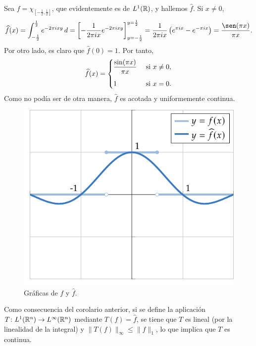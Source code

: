 \documentclass[a4paper, 11pt, oneside]{report}
\begin{document}
\begin{example}\label{eje:3.1.4}
  Sea $f = \chi_{[-\frac{1}{2},\frac{1}{2}]}$, que evidentemente es de $L^1(\mathbb R)$, y hallemos $\widehat{f}$. Si $x \neq 0$,
  \[\widehat{f}(x)
    = \int_{-\frac{1}{2}}^{\frac{1}{2}} e^{-2\pi i x y} \, d
    = \left[-\frac{1}{2\pi i x}e^{-2\pi i x y}\right]_{y = -\frac{1}{2}}^{y = \frac{1}{2}}
    = \frac{1}{2\pi i x}\left(e^{\pi i x} - e^{-\pi i x}\right)
    = \frac{\sen(\pi x)}{\pi x}.\]
  Por otro lado, es claro que $\widehat{f}(0)=1$. Por tanto,
  \[\widehat{f}(x) = \begin{cases}
    \displaystyle \frac{\sin(\pi x)}{\pi x} & $ si $ x \neq 0, \\[10pt]
    1 & $ si $ x = 0.
  \end{cases}\]
  Como no podía ser de otra manera, $\widehat{f}$ es acotada y uniformemente continua.

  \begin{figure}[H]
    \centering
    \includegraphics{./plot12/main.pdf}
    \caption{Gráficas de $f$ y $\widehat{f}$.}
  \end{figure}

\end{example}

Como consecuencia del corolario anterior, si se define la aplicación $T \colon L^1(\mathbb R^n) \to L^\infty(\mathbb R^n)$ mediante $T(f)=\widehat{f}$, se tiene que $T$ es lineal (por la linealidad de la integral) y $\|T(f)\|_\infty \leq \|f\|_1$, lo que implica que $T$ es continua.
\end{document}
